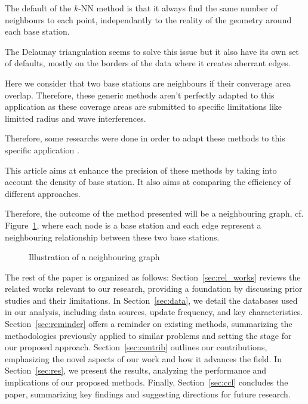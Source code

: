 \documentclass[lettersize,journal,english]{IEEEtran}
\begin{document}
    The default of the $k$-NN method is that it always find the same number of neighbours to each point, independantly to the reality of the geometry around each base station.
    
    The Delaunay triangulation seems to solve this issue but it also have its own set of defaults, mostly on the borders of the data where it creates aberrant edges.

    Here we consider that two base stations are neighbours if their converage area overlap. Therefore, these generic methods aren't perfectly adapted to this application as these coverage areas are submitted to specific limitations like limitted radius and wave interferences.

    Therefore, some researchs were done in order to adapt these methods to this specific application \cite{patent_neighs}.

    This article aims at enhance the precision of these methods by taking into account the density of base station. It also aims at comparing the efficiency of different approaches. 

    Therefore, the outcome of the method presented will be a neighbouring graph, cf. Figure~\ref{fig:neigh_graph}, where each node is a base station and each edge represent a neighbouring relationship between these two base stations.
    \begin{figure}
        \centering
        \caption{Illustration of a neighbouring graph}
        \label{fig:neigh_graph}
    \end{figure}

    The rest of the paper is organized as follows: Section~\ref{sec:rel_works} reviews the related works relevant to our research, providing a foundation by discussing prior studies and their limitations. In Section~\ref{sec:data}, we detail the databases used in our analysis, including data sources, update frequency, and key characteristics. Section~\ref{sec:reminder} offers a reminder on existing methods, summarizing the methodologies previously applied to similar problems and setting the stage for our proposed approach. Section~\ref{sec:contrib} outlines our contributions, emphasizing the novel aspects of our work and how it advances the field. In Section~\ref{sec:res}, we present the results, analyzing the performance and implications of our proposed methods. Finally, Section~\ref{sec:ccl} concludes the paper, summarizing key findings and suggesting directions for future research.
\end{document}
